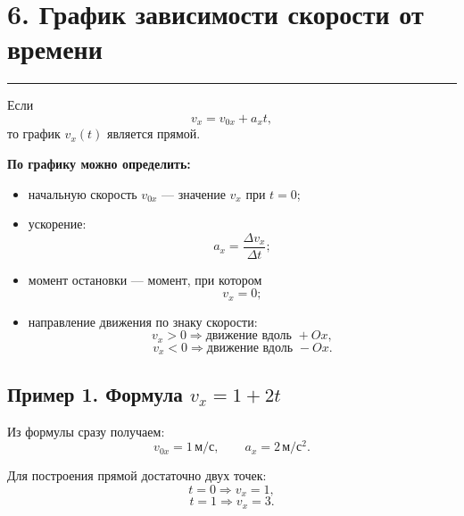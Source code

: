 \documentclass[a4paper,12pt]{article}
\newcommand{\sectionline}{%
  \par\vspace{-0.5em}%
  \noindent\textcolor{accent}{\rule{\linewidth}{0.7pt}}%
  \par\vspace{0.5em}%
}
\newcommand{\key}[1]{\textcolor{darkaccent}{\textbf{#1}}}
\begin{document}
\clearpage


\section*{6. График зависимости скорости от времени}
\sectionline

Если
\[
  v_x=v_{0x}+a_xt,
\]
то график \(v_x(t)\) является прямой.

\key{По графику можно определить:}

\begin{itemize}
  \item начальную скорость \(v_{0x}\) --- значение \(v_x\) при \(t=0\);

  \item ускорение:
  \[
    a_x=\frac{\Delta v_x}{\Delta t};
  \]

  \item момент остановки --- момент, при котором
  \[
    v_x=0;
  \]

  \item направление движения по знаку скорости:
  \[
    v_x>0
    \Rightarrow
    \text{движение вдоль }+Ox,
  \]
  \[
    v_x<0
    \Rightarrow
    \text{движение вдоль }-Ox.
  \]
\end{itemize}

\subsection*{Пример 1. Формула \(v_x=1+2t\)}

Из формулы сразу получаем:
\[
  v_{0x}=1\,\text{м}/\text{с},
  \qquad
  a_x=2\,\text{м}/\text{с}^2.
\]

Для построения прямой достаточно двух точек:
\[
  t=0
  \Rightarrow
  v_x=1,
\]
\[
  t=1
  \Rightarrow
  v_x=3.
\]

\begin{center}
\end{center}
\end{document}

